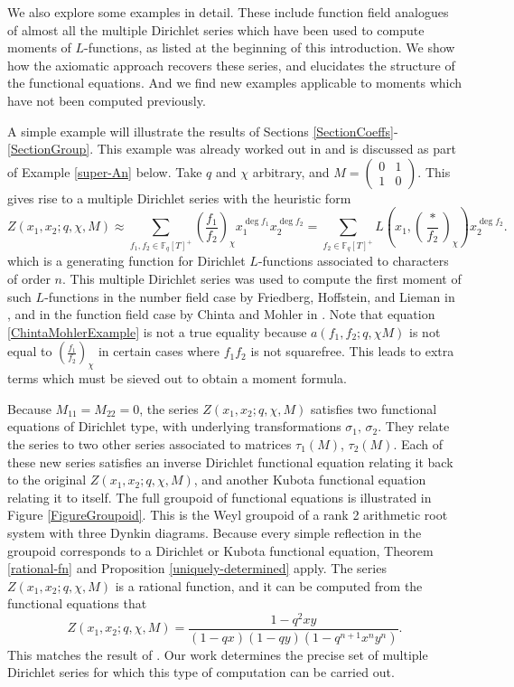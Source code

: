\documentclass[11pt,letterpaper]{article}
\theoremstyle{definition}
\theoremstyle{remark}
\numberwithin{equation}{section}
\theoremstyle{dotless}
\newcommand{\F}{\mathbb{F}}
\newcommand{\res}[2]{\left(\frac{#1}{#2}\right)}
\begin{document}
We also explore some examples in detail. These include function field analogues of almost all the multiple Dirichlet series which have been used to compute moments of $L$-functions, as listed at the beginning of this introduction. We show how the axiomatic approach recovers these series, and elucidates the structure of the functional equations. And we find new examples applicable to moments which have not been computed previously. 

A simple example will illustrate the results of Sections \ref{SectionCoeffs}-\ref{SectionGroup}. This example was already worked out in \cite[Prop. 4.1]{s-amds} and is discussed as part of Example \ref{super-An} below. Take $q$ and $\chi$ arbitrary, and $M=\begin{pmatrix} 0 & 1 \\ 1 & 0 \end{pmatrix}$. This gives rise to a multiple Dirichlet series with the heuristic form 
\begin{equation} \label{ChintaMohlerExample}
Z(x_1, x_2; q, \chi, M) \approx \sum_{f_1, f_2 \in \F_q[T]^+} \res{f_1}{f_2}_\chi x_1^{\deg f_1} x_2^{\deg f_2} = \sum_{f_2 \in \F_q[T]^+} L\left(x_1, \res{*}{f_2}_\chi \right) x_2^{\deg f_2}.
\end{equation}
which is a generating function for Dirichlet $L$-functions associated to characters of order $n$. This multiple Dirichlet series was used to compute the first moment of such $L$-functions in the number field case by Friedberg, Hoffstein, and Lieman in \cite{FriedbergHoffsteinLieman}, and in the function field case by Chinta and Mohler in \cite{ChintaMohler}. Note that equation \eqref{ChintaMohlerExample} is not a true equality because $a(f_1, f_2; q, \chi M)$ is not equal to $\res{f_1}{f_2}_\chi$ in certain cases where $f_1f_2$ is not squarefree. This leads to extra terms which must be sieved out to obtain a moment formula. 

Because $M_{11}=M_{22}=0$, the series $Z(x_1, x_2; q, \chi, M)$ satisfies two functional equations of Dirichlet type, with underlying transformations $\sigma_1, \, \sigma_2$. They relate the series to two other series associated to matrices $\tau_1(M)$, $\tau_2(M)$. Each of these new series satisfies an inverse Dirichlet functional equation relating it back to the original $Z(x_1, x_2; q, \chi, M)$, and another Kubota functional equation relating it to itself. The full groupoid of functional equations is illustrated in Figure \ref{FigureGroupoid}. This is the Weyl groupoid of a rank 2 arithmetic root system with three Dynkin diagrams. Because every simple reflection in the groupoid corresponds to a Dirichlet or Kubota functional equation, Theorem \ref{rational-fn} and Proposition \ref{uniquely-determined} apply. The series $Z(x_1, x_2; q, \chi, M)$ is a rational function, and it can be computed from the functional equations that 
\begin{equation}
Z(x_1, x_2; q, \chi, M)=\frac{1-q^2 x y}{(1-q x) (1-q y) \left(1-q^{n+1} x^n y^n\right)}.
\end{equation}
This matches the result of \cite{ChintaMohler}. Our work determines the precise set of multiple Dirichlet series for which this type of computation can be carried out.
\end{document}
